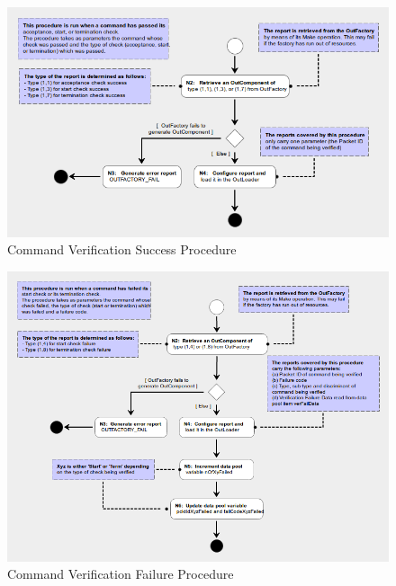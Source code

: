 \documentclass[a4paper,10pt]{article}
\begin{document}
\begin{figure}[htbp]
 \centering
 \includegraphics[scale=0.415,keepaspectratio=true]{CrPsCmdVerSucc.png}
 \caption{Command Verification Success Procedure}
 \label{fig:CmdVerSucc}
\end{figure}

\begin{figure}[htbp]
 \centering
 \includegraphics[scale=0.415,keepaspectratio=true]{CrPsCmdVerFail.png}
 \caption{Command Verification Failure Procedure}
 \label{fig:CmdVerFail}
\end{figure}
\end{document}
